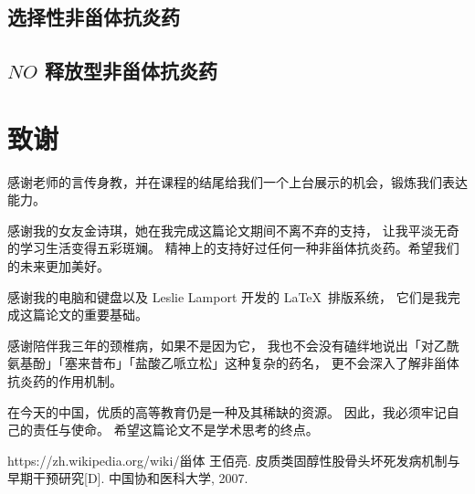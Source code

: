 \documentclass[12pt, a4paper, oneside]{ctexart}
\begin{document}
\subsection{选择性非甾体抗炎药}

\subsection{$NO$ 释放型非甾体抗炎药}


\newpage
\section*{致谢}
感谢老师的言传身教，并在课程的结尾给我们一个上台展示的机会，锻炼我们表达能力。

感谢我的女友金诗琪，她在我完成这篇论文期间不离不弃的支持，
让我平淡无奇的学习生活变得五彩斑斓。
精神上的支持好过任何一种非甾体抗炎药。希望我们的未来更加美好。

感谢我的电脑和键盘以及 Leslie Lamport 开发的 \LaTeX \ 排版系统，
它们是我完成这篇论文的重要基础。

感谢陪伴我三年的颈椎病，如果不是因为它，
我也不会没有磕绊地说出「对乙酰氨基酚」「塞来昔布」「盐酸乙哌立松」这种复杂的药名，
更不会深入了解非甾体抗炎药的作用机制。

在今天的中国，优质的高等教育仍是一种及其稀缺的资源。
因此，我必须牢记自己的责任与使命。
希望这篇论文不是学术思考的终点。

\begin{thebibliography}{99}

    https://zh.wikipedia.org/wiki/甾体
    王佰亮. 皮质类固醇性股骨头坏死发病机制与早期干预研究[D]. 中国协和医科大学, 2007.
    
\end{thebibliography}
\end{document}
